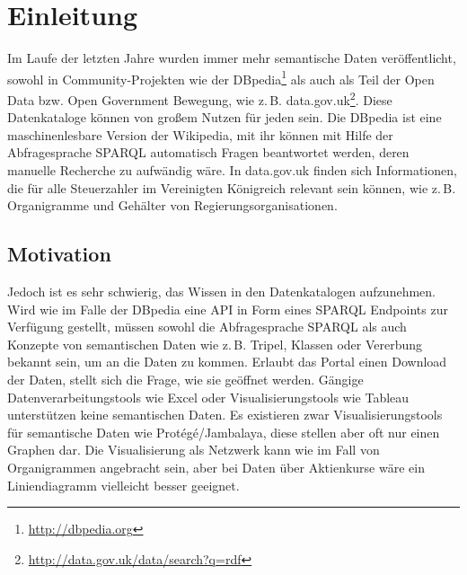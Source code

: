 \documentclass[
	headsepline,
	footsepline,
	fontsize=12pt,
	bibliography=totoc
]{scrbook}
\begin{document}
\frontmatter
{}
\mmtfrontmatter

\listoffigures
\listoftables
\printglossary[type=\acronymtype,style=long,title=Abkürzungsverzeichnis,toctitle=Abkürzungsverzeichnis]

\mainmatter

\chapter{Einleitung}
\label{chapter:einleitung}


Im Laufe der letzten Jahre wurden immer mehr semantische Daten veröffentlicht, sowohl in Community-Projekten wie der DBpedia\footnote{\url{http://dbpedia.org}} als auch als Teil der Open Data bzw. Open Government Bewegung, wie z.\,B. data.gov.uk\footnote{\url{http://data.gov.uk/data/search?q=rdf}}. Diese Datenkataloge können von großem Nutzen für jeden sein. Die DBpedia ist eine maschinenlesbare Version der Wikipedia, mit ihr können mit Hilfe der Abfragesprache SPARQL automatisch Fragen beantwortet werden, deren manuelle Recherche zu aufwändig wäre. In data.gov.uk finden sich Informationen, die für alle Steuerzahler im Vereinigten Königreich relevant sein können, wie z.\,B. Organigramme und Gehälter von Regierungsorganisationen.

\section{Motivation}
\label{section:einleitung:motivation}



Jedoch ist es sehr schwierig, das Wissen in den Datenkatalogen aufzunehmen. Wird wie im Falle der DBpedia eine API in Form eines SPARQL Endpoints zur Verfügung gestellt, müssen sowohl die Abfragesprache SPARQL als auch Konzepte von semantischen Daten wie z.\,B. Tripel, Klassen oder Vererbung bekannt sein, um an die Daten zu kommen. Erlaubt das Portal einen Download der Daten, stellt sich die Frage, wie sie geöffnet werden. Gängige Datenverarbeitungstools wie Excel oder Visualisierungstools wie Tableau unterstützen keine semantischen Daten. Es existieren zwar Visualisierungstools für semantische Daten wie Protégé/Jambalaya, diese stellen aber oft nur einen Graphen dar. Die Visualisierung als Netzwerk kann wie im Fall von Organigrammen angebracht sein, aber bei Daten über Aktienkurse wäre ein Liniendiagramm vielleicht besser geeignet.
\end{document}
